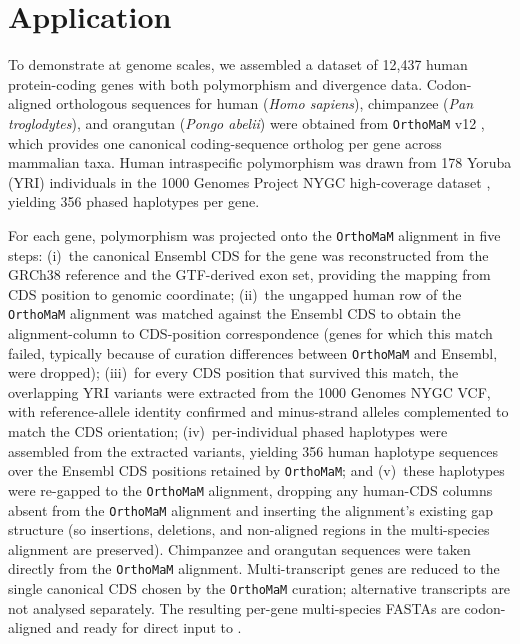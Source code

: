 \section{Application}

To demonstrate \mkado at genome scales,
we assembled a dataset of 12,437 human protein-coding genes
with both polymorphism and divergence data.
Codon-aligned orthologous sequences
for human (\textit{Homo sapiens}),
chimpanzee (\textit{Pan troglodytes}),
and orangutan (\textit{Pongo abelii})
were obtained from \texttt{OrthoMaM} v12 \citep{orthomam2024},
which provides one canonical coding-sequence ortholog per gene
across mammalian taxa.
Human intraspecific polymorphism was drawn from 178 Yoruba (YRI)
individuals in the 1000 Genomes Project NYGC high-coverage dataset
\citep{1000genomes2015},
yielding 356 phased haplotypes per gene.

For each gene, polymorphism was projected onto the
\texttt{OrthoMaM} alignment in five steps:
(i)~the canonical Ensembl CDS for the gene was reconstructed from
the GRCh38 reference and the GTF-derived exon set, providing the
mapping from CDS position to genomic coordinate;
(ii)~the ungapped human row of the \texttt{OrthoMaM} alignment was
matched against the Ensembl CDS to obtain the alignment-column to
CDS-position correspondence (genes for which this match failed,
typically because of curation differences between
\texttt{OrthoMaM} and Ensembl, were dropped);
(iii)~for every CDS position that survived this match, the
overlapping YRI variants were extracted from the 1000 Genomes
NYGC VCF, with reference-allele identity confirmed and
minus-strand alleles complemented to match the CDS orientation;
(iv)~per-individual phased haplotypes were assembled from the
extracted variants, yielding 356 human haplotype sequences over
the Ensembl CDS positions retained by \texttt{OrthoMaM}; and
(v)~these haplotypes were re-gapped to the \texttt{OrthoMaM}
alignment, dropping any human-CDS columns absent from the
\texttt{OrthoMaM} alignment and inserting the alignment's
existing gap structure (so insertions, deletions, and
non-aligned regions in the multi-species alignment are
preserved). Chimpanzee and orangutan sequences were taken
directly from the \texttt{OrthoMaM} alignment. Multi-transcript
genes are reduced to the single canonical CDS chosen by the
\texttt{OrthoMaM} curation; alternative transcripts are not
analysed separately. The resulting per-gene multi-species FASTAs
are codon-aligned and ready for direct input to \mkado.

